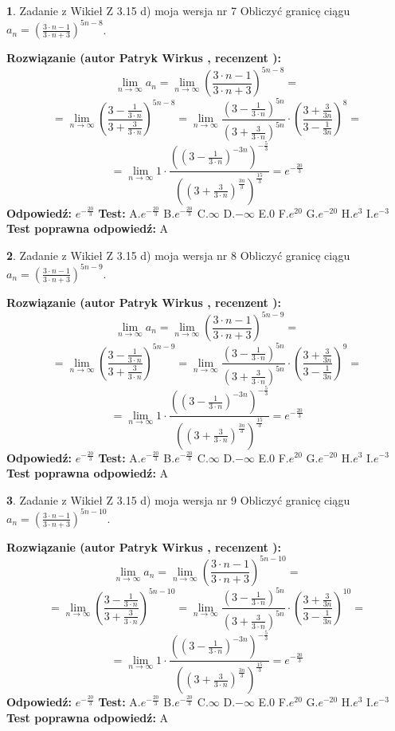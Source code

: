 \documentclass[12pt, a4paper]{article}
\theoremstyle{definition} %
\newtheorem{zad}{}
\newcommand{\zadStart}[1]{\begin{zad}#1\newline}
\newcommand{\zadStop}{\end{zad}}
\newcommand{\rozwStart}[2]{\noindent \textbf{Rozwiązanie (autor #1 , recenzent #2): }\newline}
\newcommand{\rozwStop}{\newline}
\newcommand{\odpStart}{\noindent \textbf{Odpowiedź:}\newline}
\newcommand{\odpStop}{\newline}
\newcommand{\testStart}{\noindent \textbf{Test:}\newline}
\newcommand{\testStop}{\newline}
\newcommand{\kluczStart}{\noindent \textbf{Test poprawna odpowiedź:}\newline}
\newcommand{\kluczStop}{\newline}
\begin{document}
\zadStart{Zadanie z Wikieł Z 3.15 d) moja wersja nr 7}
Obliczyć granicę ciągu $a_{n}=(\frac{3\cdot n - 1}{3 \cdot n + 3})^{5n-8}$.
\zadStop
\rozwStart{Patryk Wirkus}{}
$$\lim\limits_{n\to\infty} a_{n} = \lim\limits_{n\to\infty}(\frac{3\cdot n - 1}{3 \cdot n + 3})^{5n-8}=$$
$$=\lim\limits_{n\to\infty}(\frac{3 - \frac{1}{3\cdot n}}{3 + \frac{3}{3 \cdot n}})^{5n-8}=\lim\limits_{n\to\infty}\frac{(3 - \frac{1}{3\cdot n})^{5n}}{(3 + \frac{3}{3\cdot n})^{5n}} \cdot (\frac{3+\frac{3}{3n}}{3-\frac{1}{3n}})^{8}=$$
$$=\lim\limits_{n\to\infty} 1 \cdot \frac{((3-\frac{1}{3 \cdot n})^{-3n})^{-\frac{5}{3}}}{((3+\frac{3}{3 \cdot n})^{\frac{3n}{3}})^{\frac{15}{3}}} =e^{-\frac{20}{3}}$$
\rozwStop
\odpStart
$e^{-\frac{20}{3}}$
\odpStop
\testStart
A.$ e^{-\frac{20}{3}}$
B.$ e^{-\frac{20}{3}}$
C.$\infty$
D.$-\infty$
E.$0$
F.$e^{20}$
G.$e^{-20}$
H.$e^{3}$
I.$e^{-3}$
\testStop
\kluczStart
A
\kluczStop



\zadStart{Zadanie z Wikieł Z 3.15 d) moja wersja nr 8}
Obliczyć granicę ciągu $a_{n}=(\frac{3\cdot n - 1}{3 \cdot n + 3})^{5n-9}$.
\zadStop
\rozwStart{Patryk Wirkus}{}
$$\lim\limits_{n\to\infty} a_{n} = \lim\limits_{n\to\infty}(\frac{3\cdot n - 1}{3 \cdot n + 3})^{5n-9}=$$
$$=\lim\limits_{n\to\infty}(\frac{3 - \frac{1}{3\cdot n}}{3 + \frac{3}{3 \cdot n}})^{5n-9}=\lim\limits_{n\to\infty}\frac{(3 - \frac{1}{3\cdot n})^{5n}}{(3 + \frac{3}{3\cdot n})^{5n}} \cdot (\frac{3+\frac{3}{3n}}{3-\frac{1}{3n}})^{9}=$$
$$=\lim\limits_{n\to\infty} 1 \cdot \frac{((3-\frac{1}{3 \cdot n})^{-3n})^{-\frac{5}{3}}}{((3+\frac{3}{3 \cdot n})^{\frac{3n}{3}})^{\frac{15}{3}}} =e^{-\frac{20}{3}}$$
\rozwStop
\odpStart
$e^{-\frac{20}{3}}$
\odpStop
\testStart
A.$ e^{-\frac{20}{3}}$
B.$ e^{-\frac{20}{3}}$
C.$\infty$
D.$-\infty$
E.$0$
F.$e^{20}$
G.$e^{-20}$
H.$e^{3}$
I.$e^{-3}$
\testStop
\kluczStart
A
\kluczStop



\zadStart{Zadanie z Wikieł Z 3.15 d) moja wersja nr 9}
Obliczyć granicę ciągu $a_{n}=(\frac{3\cdot n - 1}{3 \cdot n + 3})^{5n-10}$.
\zadStop
\rozwStart{Patryk Wirkus}{}
$$\lim\limits_{n\to\infty} a_{n} = \lim\limits_{n\to\infty}(\frac{3\cdot n - 1}{3 \cdot n + 3})^{5n-10}=$$
$$=\lim\limits_{n\to\infty}(\frac{3 - \frac{1}{3\cdot n}}{3 + \frac{3}{3 \cdot n}})^{5n-10}=\lim\limits_{n\to\infty}\frac{(3 - \frac{1}{3\cdot n})^{5n}}{(3 + \frac{3}{3\cdot n})^{5n}} \cdot (\frac{3+\frac{3}{3n}}{3-\frac{1}{3n}})^{10}=$$
$$=\lim\limits_{n\to\infty} 1 \cdot \frac{((3-\frac{1}{3 \cdot n})^{-3n})^{-\frac{5}{3}}}{((3+\frac{3}{3 \cdot n})^{\frac{3n}{3}})^{\frac{15}{3}}} =e^{-\frac{20}{3}}$$
\rozwStop
\odpStart
$e^{-\frac{20}{3}}$
\odpStop
\testStart
A.$ e^{-\frac{20}{3}}$
B.$ e^{-\frac{20}{3}}$
C.$\infty$
D.$-\infty$
E.$0$
F.$e^{20}$
G.$e^{-20}$
H.$e^{3}$
I.$e^{-3}$
\testStop
\kluczStart
A
\kluczStop
\end{document}

